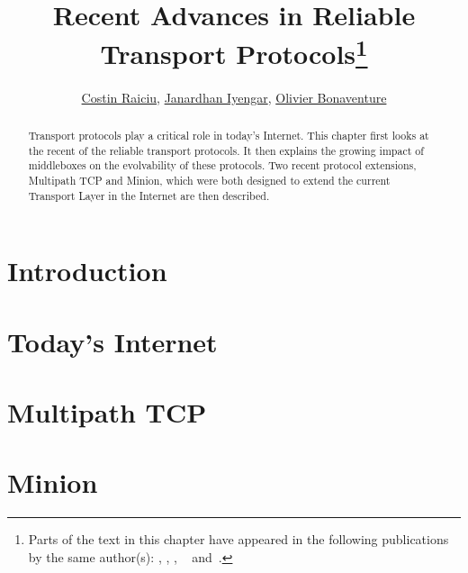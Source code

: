 \documentclass{article}
\title{Recent Advances in Reliable Transport Protocols\footnote{
Parts of the text in this chapter have appeared in the following
 publications by the same author(s): \cite{login}, \cite{mptcp-cc},
 \cite{raiciu2012hard}, ~\cite{nowlan12fitting} 
and~\cite{iyengar10minion}.}
}
\author{\href{http://nets.cs.pub.ro/~costin/}{Costin Raiciu}, \href{http://www.fandm.edu/janardhan-iyengar}{Janardhan Iyengar}, \href{http://www.uclouvain.be/olivier.bonaventure}{Olivier Bonaventure}}
\date{}
\begin{document}
\copyrightstatement

\pagestyle{empty}

\maketitle

\thispagestyle{empty}

\begin{abstract}
Transport protocols play a critical role in today's Internet. This
chapter first looks at the recent of the reliable transport
protocols. It then explains the growing impact of middleboxes on the
evolvability of these protocols. 
Two recent protocol extensions,
Multipath TCP and Minion,
which were both designed to extend the current Transport Layer 
in the Internet
are then described.
\end{abstract}


\section{Introduction}




\section{Today's Internet}\label{section:today}





%

\section{Multipath TCP}\label{section:mptcp}




\section{Minion}\label{section:minion}




\end{document}
